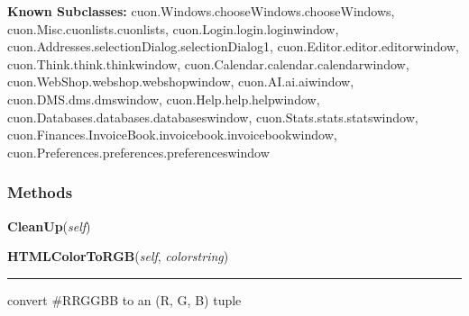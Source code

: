 \textbf{Known Subclasses:}
cuon.Windows.chooseWindows.chooseWindows,
    cuon.Misc.cuonlists.cuonlists,
    cuon.Login.login.loginwindow,
    cuon.Addresses.selectionDialog.selectionDialog1,
    cuon.Editor.editor.editorwindow,
    cuon.Think.think.thinkwindow,
    cuon.Calendar.calendar.calendarwindow,
    cuon.WebShop.webshop.webshopwindow,
    cuon.AI.ai.aiwindow,
    cuon.DMS.dms.dmswindow,
    cuon.Help.help.helpwindow,
    cuon.Databases.databases.databaseswindow,
    cuon.Stats.stats.statswindow,
    cuon.Finances.InvoiceBook.invoicebook.invoicebookwindow,
    cuon.Preferences.preferences.preferenceswindow



  \subsubsection{Methods}

    \label{cuon:Windows:windows:windows:CleanUp}

    \vspace{0.5ex}

\hspace{.8\funcindent}\begin{boxedminipage}{\funcwidth}

    \raggedright \textbf{CleanUp}(\textit{self})

\setlength{\parskip}{2ex}
\setlength{\parskip}{1ex}
    \end{boxedminipage}

    \label{cuon:Windows:windows:windows:HTMLColorToRGB}

    \vspace{0.5ex}

\hspace{.8\funcindent}\begin{boxedminipage}{\funcwidth}

    \raggedright \textbf{HTMLColorToRGB}(\textit{self}, \textit{colorstring})

    \vspace{-1.5ex}

    \rule{\textwidth}{0.5\fboxrule}
\setlength{\parskip}{2ex}
    convert \#RRGGBB to an (R, G, B) tuple

\setlength{\parskip}{1ex}
    \end{boxedminipage}

